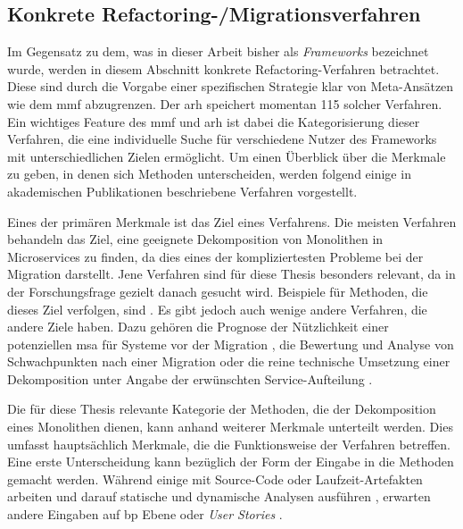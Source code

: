 \subsection{Konkrete Refactoring-/Migrationsverfahren}

Im Gegensatz zu dem, was in dieser Arbeit bisher als \emph{Frameworks} bezeichnet wurde, werden in diesem Abschnitt konkrete Refactoring-Verfahren betrachtet.
Diese sind durch die Vorgabe einer spezifischen Strategie klar von Meta-Ansätzen wie dem \gls{mmf} abzugrenzen.
Der \gls{arh} speichert momentan 115 solcher Verfahren.
Ein wichtiges Feature des \gls{mmf} und \gls{arh} ist dabei die Kategorisierung dieser Verfahren, die eine individuelle Suche für verschiedene Nutzer des Frameworks mit unterschiedlichen Zielen ermöglicht.
Um einen Überblick über die Merkmale zu geben, in denen sich Methoden unterscheiden, werden folgend einige in akademischen Publikationen beschriebene Verfahren vorgestellt.

Eines der primären Merkmale ist das Ziel eines Verfahrens.
Die meisten Verfahren behandeln das Ziel, eine geeignete Dekomposition von Monolithen in Microservices zu finden, da dies eines der kompliziertesten Probleme bei der Migration darstellt.
Jene Verfahren sind für diese Thesis besonders relevant, da in der Forschungsfrage gezielt danach gesucht wird.
Beispiele für Methoden, die dieses Ziel verfolgen, sind \cite{arh-result-no-filter-3,arh-result-no-filter-2,arh-result-no-filter-5,arh-result-important-filter-4,arh-result-important-filter-7}.
Es gibt jedoch auch wenige andere Verfahren, die andere Ziele haben.
Dazu gehören die Prognose der Nützlichkeit einer potenziellen \gls{msa} für Systeme vor der Migration \cite{muP-a-dev-framework}, die Bewertung und Analyse von Schwachpunkten nach einer Migration \cite{https://doi.org/10.1002/spe.2974} oder die reine technische Umsetzung einer Dekomposition unter Angabe der erwünschten Service-Aufteilung \cite{arh-result-no-filter-4}.

Die für diese Thesis relevante Kategorie der Methoden, die der Dekomposition eines Monolithen dienen, kann anhand weiterer Merkmale unterteilt werden.
Dies umfasst hauptsächlich Merkmale, die die Funktionsweise der Verfahren betreffen.
Eine erste Unterscheidung kann bezüglich der Form der Eingabe in die Methoden gemacht werden.
Während einige mit Source-Code oder Laufzeit-Artefakten arbeiten und darauf statische und dynamische Analysen ausführen \cite{arh-result-no-filter-5}, erwarten andere Eingaben auf \acrlong{bp} Ebene \cite{arh-result-no-filter-3} oder \emph{User Stories} \cite{arh-result-no-filter-2}.

